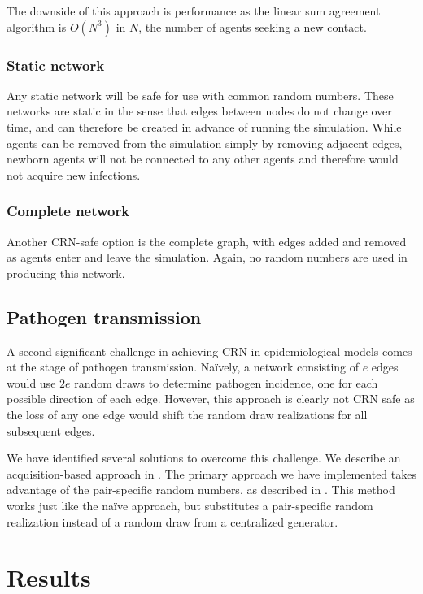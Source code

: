 \documentclass[10pt,letterpaper]{article}
\begin{document}
The downside of this approach is performance as the linear sum agreement algorithm is $O(N^3)$ in $N$, the number of agents seeking a new contact.

\subsubsection*{Static network}\label{s:static_net}
Any static network will be safe for use with common random numbers. These networks are static in the sense that edges between nodes do not change over time, and can therefore be created in advance of running the simulation. While agents can be removed from the simulation simply by removing adjacent edges, newborn agents will not be connected to any other agents and therefore would not acquire new infections.

\subsubsection*{Complete network}
Another CRN-safe option is the complete graph, with edges added and removed as agents enter and leave the simulation. Again, no random numbers are used in producing this network.


\subsection*{Pathogen transmission}
\label{s:pathogen_transmission}

A second significant challenge in achieving CRN in epidemiological models comes at the stage of pathogen transmission. Na{\"i}vely, a network consisting of $e$ edges would use $2e$ random draws to determine pathogen incidence, one for each possible direction of each edge. However, this approach is clearly not CRN safe as the loss of any one edge would shift the random draw realizations for all subsequent edges.

We have identified several solutions to overcome this challenge. We describe an acquisition-based approach in . The primary approach we have implemented takes advantage of the pair-specific random numbers, as described in . This method works just like the na{\"i}ve approach, but substitutes a pair-specific random realization instead of a random draw from a centralized generator.



\section*{Results}\label{s:results}
\end{document}
